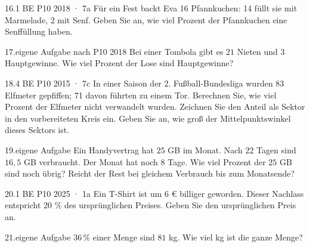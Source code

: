 \documentclass[11pt]{article}
\begin{document}
\begin{pfaufgabe}{16.}{1 BE \textperiodcentered{} P10 2018 · 7a}
Für ein Fest backt Eva 16 Pfannkuchen: 14 füllt sie mit Marmelade, 2 mit Senf. Geben Sie an, wie viel Prozent der Pfannkuchen eine Senffüllung haben.
\end{pfaufgabe}
\begin{pfaufgabe}{17.}{eigene Aufgabe nach P10 2018}
Bei einer Tombola gibt es $21$ Nieten und $3$ Hauptgewinne. Wie viel Prozent der Lose sind Hauptgewinne?
\end{pfaufgabe}
\begin{pfaufgabe}{18.}{4 BE \textperiodcentered{} P10 2015 · 7c}
In einer Saison der 2. Fußball-Bundesliga wurden 83 Elfmeter gepfiffen; 71 davon führten zu einem Tor. Berechnen Sie, wie viel Prozent der Elfmeter nicht verwandelt wurden. Zeichnen Sie den Anteil als Sektor in den vorbereiteten Kreis ein. Geben Sie an, wie groß der Mittelpunktswinkel dieses Sektors ist.
\par\smallskip\noindent \kreisleer[2]\par
{}
\end{pfaufgabe}
\begin{pfaufgabe}{19.}{eigene Aufgabe}
Ein Handyvertrag hat $25$ GB im Monat. Nach $22$ Tagen sind $16{,}5$ GB verbraucht. Der Monat hat noch $8$ Tage. Wie viel Prozent der $25$ GB sind noch übrig? Reicht der Rest bei gleichem Verbrauch bis zum Monatsende?
\end{pfaufgabe}
\begin{pfaufgabe}{20.}{1 BE \textperiodcentered{} P10 2025 · 1a}
Ein T-Shirt ist um 6 € billiger geworden. Dieser Nachlass entspricht 20 \% des ursprünglichen Preises. Geben Sie den ursprünglichen Preis an.
\end{pfaufgabe}
\begin{pfaufgabe}{21.}{eigene Aufgabe}
$36\,\%$ einer Menge sind $81$ kg. Wie viel kg ist die ganze Menge?
\end{pfaufgabe}
\end{document}
